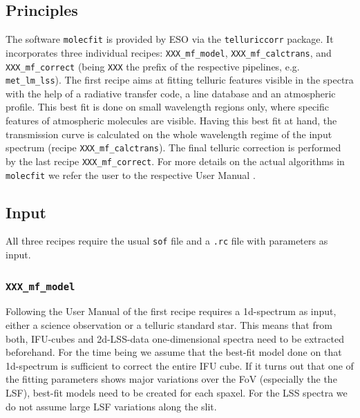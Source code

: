 \subsection{Principles}\label{app:mf_principles}
The software \texttt{molecfit} is provided by \ac{ESO} via the \texttt{telluriccorr} package. It incorporates three individual recipes: \texttt{XXX\_mf\_model}, \texttt{XXX\_mf\_calctrans}, and \texttt{XXX\_mf\_correct} (being \texttt{XXX} the prefix of the respective pipelines, e.g. \texttt{met\_lm\_lss}). The first recipe aims at fitting telluric features visible in the spectra with the help of a radiative transfer code, a line database and an atmospheric profile. This best fit is done on small wavelength regions only, where specific features of atmospheric molecules are visible. Having this best fit at hand, the transmission curve is calculated on the whole wavelength regime of the input spectrum (recipe \texttt{XXX\_mf\_calctrans}). The final telluric correction is performed by the last recipe \texttt{XXX\_mf\_correct}. For more details on the actual algorithms in \texttt{molecfit} we refer the user to the respective User Manual \cite{molecfit}.\\

\subsection{Input}\label{app:mf_input}
All three recipes require the usual \texttt{sof} file and a \texttt{.rc} file with parameters as input.
\subsubsection{\texttt{XXX\_mf\_model}}
Following the User Manual of \mf\cite{molecfit} the first recipe requires a 1d-spectrum as input, either a science observation or a telluric standard star. This means that from both, \ac{IFU}-cubes and 2d-\ac{LSS}-data one-dimensional spectra need to be extracted beforehand. For the time being we assume that the best-fit model done on that 1d-spectrum is sufficient to correct the entire \ac{IFU} cube. If it turns out that one of the fitting parameters shows major variations over the \ac{FoV} (especially the the \ac{LSF}), best-fit models need to be created for each spaxel. For the \ac{LSS} spectra we do not assume large \ac{LSF} variations along the slit. \\
